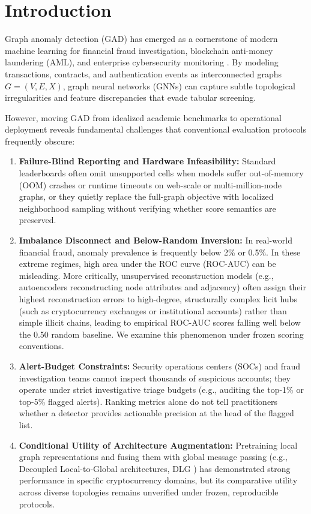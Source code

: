 \documentclass[applsci,article,submit,moreauthors,pdftex]{Definitions/mdpi}
\begin{document}
\section{Introduction}
\label{sec:introduction}
Graph anomaly detection (GAD) has emerged as a cornerstone of modern machine learning for financial fraud investigation, blockchain anti-money laundering (AML), and enterprise cybersecurity monitoring \cite{ma2023survey,qiao2025survey,dilini2026comprehensive}. By modeling transactions, contracts, and authentication events as interconnected graphs $G=(V, E, X)$, graph neural networks (GNNs) can capture subtle topological irregularities and feature discrepancies that evade tabular screening.

However, moving GAD from idealized academic benchmarks to operational deployment reveals fundamental challenges that conventional evaluation protocols frequently obscure:
\begin{enumerate}
    \item \textbf{Failure-Blind Reporting and Hardware Infeasibility:} Standard leaderboards often omit unsupported cells when models suffer out-of-memory (OOM) crashes or runtime timeouts on web-scale or multi-million-node graphs, or they quietly replace the full-graph objective with localized neighborhood sampling without verifying whether score semantics are preserved.
    \item \textbf{Imbalance Disconnect and Below-Random Inversion:} In real-world financial fraud, anomaly prevalence is frequently below 2\% or 0.5\%. In these extreme regimes, high area under the ROC curve (ROC-AUC) can be misleading. More critically, unsupervised reconstruction models (e.g., autoencoders reconstructing node attributes and adjacency) often assign their highest reconstruction errors to high-degree, structurally complex licit hubs (such as cryptocurrency exchanges or institutional accounts) rather than simple illicit chains, leading to empirical ROC-AUC scores falling well below the 0.50 random baseline. We examine this phenomenon under frozen scoring conventions.
    \item \textbf{Alert-Budget Constraints:} Security operations centers (SOCs) and fraud investigation teams cannot inspect thousands of suspicious accounts; they operate under strict investigative triage budgets (e.g., auditing the top-1\% or top-5\% flagged alerts). Ranking metrics alone do not tell practitioners whether a detector provides actionable precision at the head of the flagged list.
    \item \textbf{Conditional Utility of Architecture Augmentation:} Pretraining local graph representations and fusing them with global message passing (e.g., Decoupled Local-to-Global architectures, DLG \cite{park2026dlg}) has demonstrated strong performance in specific cryptocurrency domains, but its comparative utility across diverse topologies remains unverified under frozen, reproducible protocols.
\end{enumerate}
\end{document}

